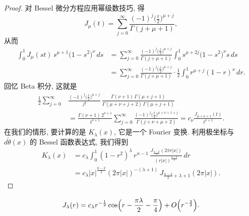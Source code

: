\begin{proof}
对 Bessel 微分方程应用幂级数技巧, 得
\[
J_{\mu}(t)=\sum_{j=0}^{\infty}\frac{(-1)^{j}\bigl(\frac{t}{2}\bigr)^{\mu+j}}{\Gamma(j+\mu+1)},
\]
从而
\begin{align*}
\int_{0}^{1}J_{\mu}(st)\,s^{\mu+1}\bigl(1-s^{2}\bigr)^{\nu}\,ds
&=\sum_{j=0}^{\infty}\frac{(-1)^{j}\bigl(\frac{t}{2}\bigr)^{\mu+j}}{\Gamma(j+\mu+1)}
\int_{0}^{1}s^{\mu+2j}\bigl(1-s^{2}\bigr)^{\nu}s\,ds \\
&=\sum_{j=0}^{\infty}\frac{(-1)^{j}\bigl(\frac{t}{2}\bigr)^{\mu+j}}{\Gamma(j+\mu+1)}\cdot\frac{1}{2}\int_{0}^{1}r^{\mu+j}(1-r)^{\nu}\,dr.
\end{align*}
回忆 Beta 积分, 这就是
\begin{align*}
\frac{1}{2}\sum_{j=0}^{\infty}&\frac{(-1)^{j}\bigl(\frac{t}{2}\bigr)^{\mu+j}}{j!}\,
\frac{\Gamma(\nu+1)\,\Gamma(\mu+j+1)}{\Gamma(\mu+\nu+j+2)\,\Gamma(\mu+j+1)} \\
&=\frac{\Gamma(\nu+1)\,2^{\nu+1}}{t^{\nu+1}}\sum_{j=0}^{\infty}\frac{(-1)^{j}\bigl(\frac{t}{2}\bigr)^{\mu+\nu+1+j}}{\Gamma(j+\nu+\mu+2)}
=c_{\nu}\frac{J_{\mu+\nu+1}(t)}{t^{\nu+1}}.
\end{align*}
在我们的情形, 要计算的是 $K_{\lambda}(x)$, 它是一个 Fourier 变换. 利用极坐标与 $d\check{\theta}(x)$ 的 Bessel 函数表达式, 我们得到
\begin{align*}
K_{\lambda}(x)&=c_{\lambda}\int_{0}^{1}(1-r^{2})^{\lambda}\,r^{n-1}\,
\frac{J_{\frac{n-2}{2}}(2\pi r|x|)}{(r|x|)^{\frac{n-2}{2}}}\,dr \\
&=c_{\lambda}|x|^{\frac{n-2}{2}}(2\pi|x|)^{-(\lambda+1)}\,J_{\frac{n-2}{2}+\lambda+1}(2\pi|x|).
\end{align*}
\end{proof}

\begin{proposition}\label{prop:5.3}
\[
J_{\lambda}(r)=c_{\lambda}r^{-\frac{1}{2}}\cos\Bigl(r-\frac{\pi\lambda}{2}-\frac{\pi}{4}\Bigr)+O\Bigl(r^{-\frac{3}{2}}\Bigr).
\]
\end{proposition}

